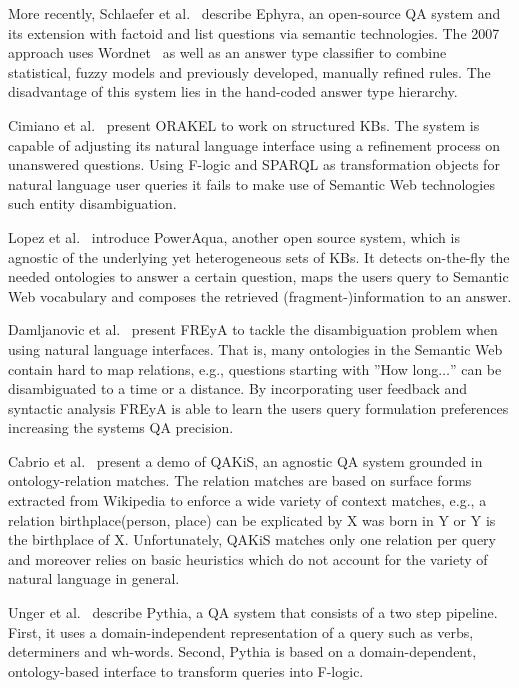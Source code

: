 More recently, {Schlaefer et al.~\cite{ephyra2007}} describe {Ephyra}, an open-source \ac{QA} system and its extension with factoid and list questions via semantic technologies.
The 2007 approach uses Wordnet~\cite{wordnet} as well as an answer type classifier to combine statistical, fuzzy models and previously developed, manually refined rules. The disadvantage of this system lies in the hand-coded answer type hierarchy. %

Cimiano et al.~\cite{orakel} present {ORAKEL} to work on structured \ac{KB}s.
The system is capable of adjusting its natural language interface using a refinement process on unanswered questions. 
Using F-logic and SPARQL as transformation objects for natural language user queries it fails to make use of Semantic Web technologies such entity disambiguation.

{Lopez et al.~\cite{poweraqua}} introduce {PowerAqua}, another open source system, which is agnostic of the underlying yet heterogeneous sets of \ac{KB}s. 
It detects on-the-fly the needed ontologies to answer a certain question, maps the users query to Semantic Web vocabulary and composes the retrieved (fragment-)information to an answer. 

{Damljanovic et al.~\cite{freya}} present {FREyA} to tackle the disambiguation problem	 when using natural language interfaces. 
That is, many ontologies in the Semantic Web contain hard to map relations, e.g., questions starting with ''How long$\ldots$'' can be disambiguated to a time or a distance. 
By incorporating user feedback and syntactic analysis FREyA is able to learn the users query formulation preferences increasing the systems \ac{QA} precision. 

{Cabrio et al.~\cite{qakis}} present a demo of {QAKiS}, an agnostic \ac{QA} system grounded in ontology-relation matches. 
The relation matches are based on surface forms extracted from Wikipedia to enforce a wide variety of context matches, e.g., a relation birthplace(person, place) can be explicated by X was born in Y or Y is the birthplace of X. 
Unfortunately, QAKiS matches only one relation per query and moreover relies on basic heuristics which do not account for the variety of natural language in general.

{Unger et al.~\cite{pythia}} describe {Pythia}, a \ac{QA} system that consists of a two step pipeline.
First, it uses a domain-independent representation of a query such as verbs, determiners and wh-words.
Second, Pythia is based on a domain-dependent, ontology-based interface to transform queries into F-logic.


